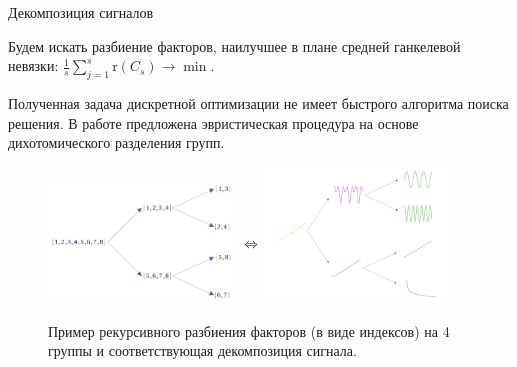 	\begin{frame}{Декомпозиция сигналов}
		
		Будем искать разбиение факторов, наилучшее в плане средней ганкелевой невязки: $ \frac{1}{s} \sum\limits_{j = 1}^s \text{r}(C_s) \to \min $.
		
		Полученная задача дискретной оптимизации не имеет быстрого алгоритма поиска решения. В работе предложена эвристическая процедура на основе дихотомического разделения групп.
		
		\begin{figure}[h!]
			\centering
			\includegraphics[width=0.45\textwidth, keepaspectratio]{../../figs/dichotomy_drawings/factors.png}    
			$ \mathrel{\raisebox{1.4cm}{$\Leftrightarrow$}} $
			\includegraphics[width=0.45\textwidth, keepaspectratio]{../../figs/dichotomy_drawings/signals.png}	
			
			\caption{Пример рекурсивного разбиения факторов (в виде индексов) на 4 группы и соответствующая декомпозиция сигнала.}\label{pic:decomp_conception}
		\end{figure}
		
	\end{frame}
	

